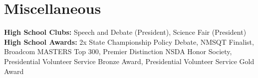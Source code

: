 \documentclass{article}
\begin{document}
\section{Miscellaneous}
\begin{itemize}[leftmargin=0.15in, label={}]
	\small{\item{

		            \textbf{High School Clubs: }{Speech and Debate (President), Science Fair (President)} \\

		            \textbf{High School Awards: }{2x State Championship Policy Debate, NMSQT Finalist, Broadcom MASTERS Top 300, Premier Distinction NSDA Honor Society, Presidential Volunteer Service Bronze Award, Presidential Volunteer Service Gold Award}\\


		      }}
\end{itemize}
\end{document}
